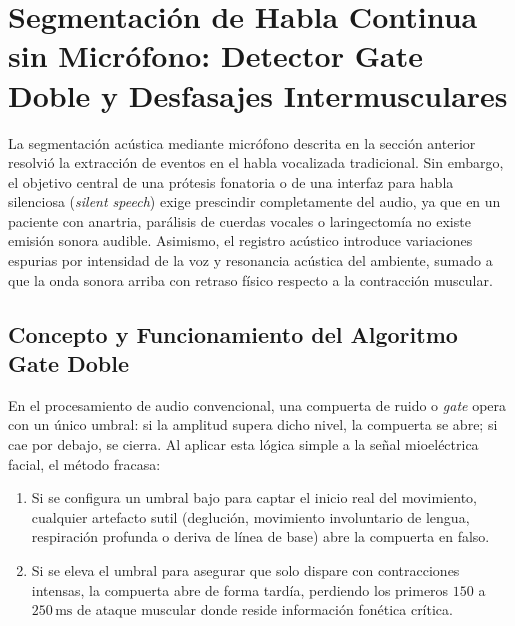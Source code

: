 \documentclass[11pt,a4paper]{article}
\begin{document}
\section{Segmentación de Habla Continua sin Micrófono: Detector Gate Doble y Desfasajes Intermusculares}
\label{sec:gate_doble}

La segmentación acústica mediante micrófono descrita en la sección anterior resolvió la extracción de eventos en el habla vocalizada tradicional. Sin embargo, el objetivo central de una prótesis fonatoria o de una interfaz para habla silenciosa (\textit{silent speech}) exige prescindir completamente del audio, ya que en un paciente con anartria, parálisis de cuerdas vocales o laringectomía no existe emisión sonora audible. Asimismo, el registro acústico introduce variaciones espurias por intensidad de la voz y resonancia acústica del ambiente, sumado a que la onda sonora arriba con retraso físico respecto a la contracción muscular.

\subsection{Concepto y Funcionamiento del Algoritmo Gate Doble}
\label{subsec:concepto_gate_doble}

En el procesamiento de audio convencional, una compuerta de ruido o \textit{gate} opera con un único umbral: si la amplitud supera dicho nivel, la compuerta se abre; si cae por debajo, se cierra. Al aplicar esta lógica simple a la señal mioeléctrica facial, el método fracasa:
\begin{enumerate}
    \item Si se configura un umbral bajo para captar el inicio real del movimiento, cualquier artefacto sutil (deglución, movimiento involuntario de lengua, respiración profunda o deriva de línea de base) abre la compuerta en falso.
    \item Si se eleva el umbral para asegurar que solo dispare con contracciones intensas, la compuerta abre de forma tardía, perdiendo los primeros $150$ a $250\,\text{ms}$ de ataque muscular donde reside información fonética crítica.
\end{enumerate}
\end{document}
